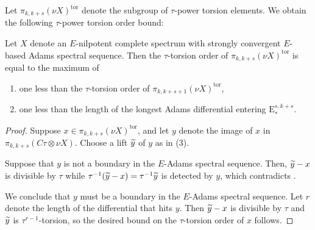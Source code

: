 Let $\pi_{k,k+s}(\nu X)^{\mathrm{tor}}$ denote the subgroup of $\tau$-power torsion elements.
We obtain the following $\tau$-power torsion order bound:

\begin{cor}\label{cor:tau-torsion-bound}
  Let $X$ denote an $E$-nilpotent complete spectrum with strongly convergent $E$-based Adams spectral sequence.
  Then the $\tau$-torsion order of $\pi_{k,k+s}(\nu X)^{\mathrm{tor}}$ is equal to the maximum of
  \begin{enumerate}
  \item one less than the $\tau$-torsion order of $\pi_{k,k+s+1}(\nu X)^{\mathrm{tor}}$,
  \item one less than the length of the longest Adams differential entering $\mathrm{E}_*^{s,k+s}$.
  \end{enumerate}
\end{cor}

\begin{proof}
  Suppose $x \in \pi_{k,k+s}(\nu X)^{\mathrm{tor}}$, and let $y$ denote the image of $x$ in $\pi_{k,k+s}(C\tau \otimes \nu X)$.
  Choose a lift $\wt{y}$ of $y$ as in (3).
  
  Suppose that $y$ is not a boundary in the $E$-Adams spectral sequence.
  Then, $\wt{y} - x$ is divisible by $\tau$ while
  $ \tau^{-1}(\wt{y} - x) = \tau^{-1} \wt{y} $
  is detected by $y$, which contradicts .
  
  We conclude that $y$ must be a boundary in the $E$-Adams spectral sequence. Let $r$ denote the length of the differential that hits $y$.
    Then $\wt{y} - x$ is divisible by $\tau$ and $\wt{y}$ is $\tau^{r-1}$-torsion, so the desired bound on the $\tau$-torsion order of $x$ follows.
\end{proof}

%

%
